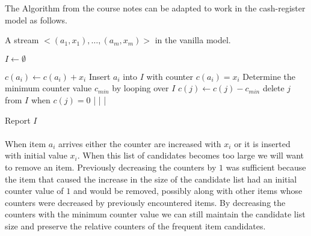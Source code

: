The Algorithm from the course notes can be adapted to work in the cash-register model as follows.

\begin{minipage}[t]{\textwidth}
\begin{sourcecode}
A stream $<(a_1, x_1), \ldots , (a_m, x_m)>$ in the vanilla model.
\silend

$I \leftarrow \emptyset$
\silend

	$c(a_i) \leftarrow c(a_i) + x_i$
\qelse
	Insert $a_i$ into $I$ with counter $c(a_i) = x_i$
		Determine the minimum counter value $c_{\textit{min}}$ by looping over $I$
			$c(j) \leftarrow c(j) - c_{\textit{min}}$
			delete $j$ from $I$ when $c(j) = 0$ 
		|
	|			
|
\silend

Report $I$
\silend
\end{sourcecode}
\end{minipage}

\paragraph{} When item $a_i$ arrives either the counter are increased with $x_i$ or it is inserted with initial value $x_i$. When this list of candidates becomes too large we will want to remove an item. Previously decreasing the counters by $1$ was sufficient because the item that caused the increase in the size of the candidate list had an initial counter value of $1$ and would be removed, possibly along with other items whose counters were decreased by previously encountered items. By decreasing the counters with the minimum counter value we can still maintain the candidate list size and preserve the relative counters of the frequent item candidates.
